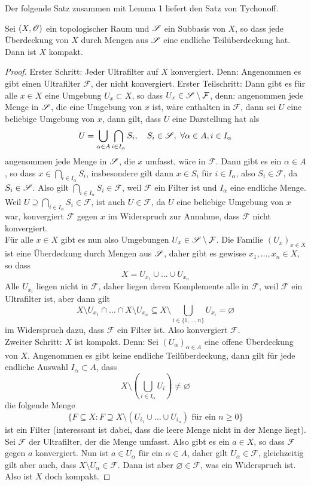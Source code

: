Der folgende Satz zusammen mit Lemma 1 liefert den Satz von Tychonoff. 
\begin{satz}
    Sei $(X,\mathscr{O})$ ein topologischer Raum und $\mathscr{S}$ ein Subbasis von $X$, so dass jede Überdeckung von $X$ durch Mengen aus $\mathscr{S}$ eine endliche Teilüberdeckung hat. Dann ist $X$ kompakt.
\end{satz}
\begin{proof}
    Erster Schritt: Jeder Ultrafilter auf $X$ konvergiert. Denn: Angenommen es gibt einen Ultrafilter $\mathcal{F}$, der nicht konvergiert. Erster Teilschritt: Dann gibt es für alle $x\in X$ eine Umgebung $U_x\subset X$, so dass $U_x\in \mathscr{S}\setminus \mathcal{F}$, denn: angenommen jede Menge in $\mathscr{S}$, die eine Umgebung von $x$ ist, wäre enthalten in $\mathcal{F}$, dann sei $U$ eine beliebige Umgebung von $x$, dann gilt, dass $U$ eine Darstellung hat als 
    \[
        U = \bigcup_{\alpha \in A} \bigcap_{i\in I_\alpha} S_i   , \quad S_i \in \mathscr{S}, \ \forall \alpha\in A, i \in I_\alpha 
    \] 
    angenommen jede Menge in $\mathscr{S}$, die $x$ umfasst, wäre in $\mathcal{F}$. Dann gibt es ein $\alpha\in A$, so dass $x\in\bigcap_{i\in I_\alpha} S_i$, insbesondere gilt dann $x\in S_i$ für $i\in I_\alpha$, also $S_i \in \mathcal{F}$, da $S_i \in \mathscr{S}$. Also gilt $\bigcap_{i\in I_\alpha}S_i\in \mathcal{F}$, weil $\mathcal{F}$ ein Filter ist und $I_\alpha$ eine endliche Menge. Weil $U\supseteq \bigcap_{i\in I_\alpha} S_i \in \mathcal{F}$, ist auch $U\in \mathcal{F}$, da $U$ eine beliebige Umgebung von $x$ war, konvergiert $\mathcal{F}$ gegen $x$ im Widerspruch zur Annahme, dass $\mathcal{F}$ nicht konvergiert.  \\
    Für alle $x\in X$ gibt es nun also Umgebungen $U_x\in \mathscr{S}\setminus \mathcal{F}$. Die Familie $(U_x)_{x\in X}$ ist eine Überdeckung durch Mengen aus $\mathscr{S}$, daher gibt es gewisse $x_1,\ldots,x_n\in X$, so dass \[X=U_{x_1}\cup \ldots\cup U_{x_n}\]
    Alle $U_{x_i}$ liegen nicht in $\mathcal{F}$, daher liegen deren Komplemente alle in $\mathcal{F}$, weil $\mathcal{F}$ ein Ultrafilter ist, aber dann gilt 
    \[
    X\setminus U_{x_1}\cap \ldots \cap X\setminus U_{x_n} \subseteq X\setminus \bigcup_{i\in \{1,\ldots,n\}} U_{x_i} = \varnothing    
    \]
    im Widerspruch dazu, dass $\mathcal{F}$ ein Filter ist. Also konvergiert $\mathcal{F}$. \\
    Zweiter Schritt: $X$ ist kompakt. Denn: Sei $(U_\alpha)_{\alpha\in A}$ eine offene Überdeckung von $X$. Angenommen es gibt keine endliche Teilüberdeckung, dann gilt für jede endliche Auswahl $I_\alpha\subset A$, dass 
    \[
    X\setminus\left(\bigcup_{i\in I_\alpha}U_{i}\right) \neq \varnothing    
    \]
    die folgende Menge 
    \[
    \{F\subseteq X: F\supseteq X\setminus (U_{i_1}\cup \ldots \cup U_{i_n}) \text{ für ein } n\ge 0 \} 
    \]
    ist ein Filter (interessant ist dabei, dass die leere Menge nicht in der Menge liegt). Sei $\mathcal{F}$ der Ultrafilter, der die Menge umfasst. Also gibt es ein $a\in X$, so dass $\mathcal{F}$ gegen $a$ konvergiert. Nun ist $a\in U_\alpha$ für ein $\alpha\in A$, daher gilt $U_\alpha\in \mathcal{F}$, gleichzeitig gilt aber auch, dass $X\setminus U_\alpha \in \mathcal{F}$. Dann ist aber $\varnothing\in\mathcal{F}$, was ein Widerspruch ist. Also ist $X$ doch kompakt.
\end{proof}
